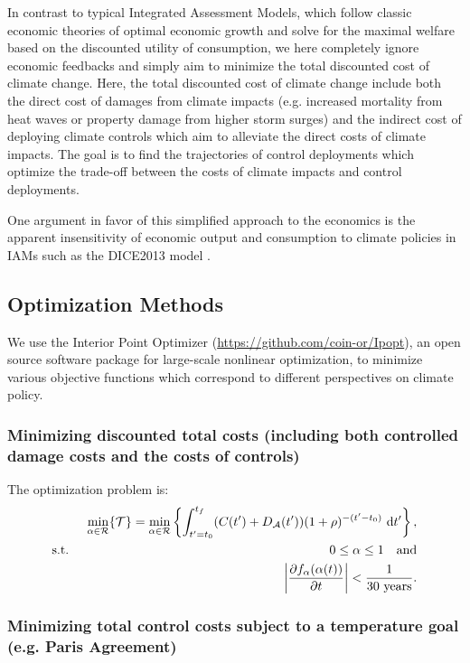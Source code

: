 \documentclass{article}
\begin{document}
In contrast to typical Integrated Assessment Models, which follow classic economic theories of optimal economic growth and solve for the maximal welfare based on the discounted utility of consumption, we here completely ignore economic feedbacks and simply aim to minimize the total discounted cost of climate change. Here, the total discounted cost of climate change include both the direct cost of damages from climate impacts (e.g. increased mortality from heat waves or property damage from higher storm surges) and the indirect cost of deploying climate controls which aim to alleviate the direct costs of climate impacts. The goal is to find the trajectories of control deployments which optimize the trade-off between the costs of climate impacts and control deployments.

One argument in favor of this simplified approach to the economics is the apparent insensitivity of economic output and consumption to climate policies in IAMs such as the DICE2013 model \cite[][figures 2 and 3]{Nordhaus}.

\subsection{Optimization Methods}

We use the Interior Point Optimizer (\href{https://github.com/coin-or/Ipopt}{https://github.com/coin-or/Ipopt}), an open source software package for large-scale nonlinear optimization, to minimize various objective functions which correspond to different perspectives on climate policy.

\subsubsection{Minimizing discounted total costs (including both controlled damage costs and the costs of controls)}

The optimization problem is:
\begin{align}
    && \min_{\alpha \in \mathcal{R}} \{ \mathcal{T} \} = \min_{\alpha \in \mathcal{R}} \left\{
    \int_{t'=t_{0}}^{t_{f}}
    (C(t') + D_{\mathcal{A}}(t')) (1 + \rho)^{-(t'-t_{0})} \text{ d}t' \right\},
    \\
    & \text{s.t. }
    & 0 \leq \alpha \leq 1\quad \text{and}\\
    && \abs{\pdv{f_{\alpha}(\alpha(t))}{t}} < \frac{1}{30\text{ years}}.
\end{align}

\subsubsection{Minimizing total control costs subject to a temperature goal (e.g. Paris Agreement)}
\end{document}
